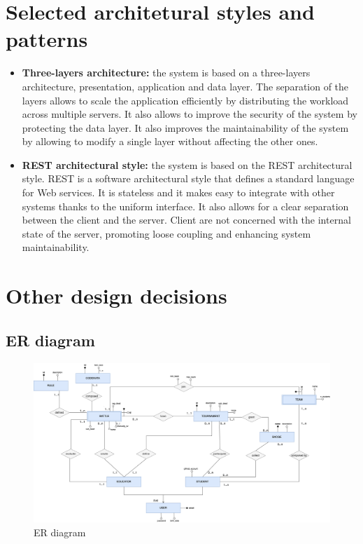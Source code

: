 \section{Selected architetural styles and patterns}

\begin{itemize}
    \item \textbf{Three-layers architecture: }the system is based on a three-layers architecture, presentation, application and data layer. The separation of the layers
    allows to scale the application efficiently by distributing the workload across multiple servers. It also allows to improve the security of the system by protecting the data layer.
    It also improves the maintainability of the system by allowing to modify a single layer without affecting the other ones.
    \item \textbf{REST architectural style: }the system is based on the REST architectural style. REST is a software architectural style that defines a standard language for Web services. It is stateless and it makes easy
    to integrate with other systems thanks to the uniform interface. It also allows for a clear separation between the client and the server. Client are not concerned with the internal state of the server, promoting loose coupling
    and enhancing system maintainability.
\end{itemize}

\section{Other design decisions}

\subsection{ER diagram}
\begin{figure}[H]
    \centering
    \includegraphics[width=1\textwidth]{images/ER_diagram.png}
    \caption{ER diagram}
\end{figure}